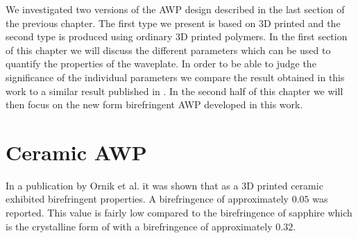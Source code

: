 We investigated two versions of the AWP design described in the last section of the previous chapter. The first type we present is based on 3D printed  and the second type is produced using ordinary 3D printed polymers. In the first section of this chapter we will discuss the different parameters which can be used to quantify the properties of the waveplate. In order to be able to judge the significance of the individual parameters we compare the result obtained in this work to a similar result published in \cite{Masson2006}. In the second half of this chapter we will then focus on the new form birefringent AWP developed in this work.

\section{Ceramic AWP}
In a publication by Ornik et al. it was shown that  as a 3D printed ceramic exhibited birefringent properties. A birefringence of approximately $0.05$ was reported. This value is fairly low compared to the birefringence of sapphire which is the crystalline form of  with a birefringence of approximately $0.32$. 

